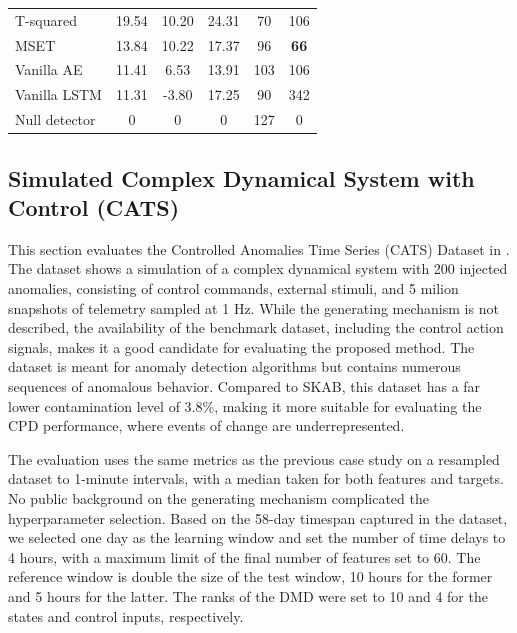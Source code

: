 \begin{table}[H]
\begin{tabular}{l *3{S[table-format=3.2]} *2{S[table-format=3.0]}}
        T-squared                    & 19.54          & 10.20          & 24.31          & 70          & 106         \\
        MSET                         & 13.84          & 10.22          & 17.37          & 96          & \textbf{66} \\
        Vanilla AE                   & 11.41          & 6.53           & 13.91          & 103         & 106         \\
        Vanilla LSTM                 & 11.31          & -3.80          & 17.25          & 90          & 342         \\
        \midrule
        Null detector                & 0              & 0              & 0              & 127         & 0           \\
        \bottomrule
    \end{tabular}
\end{table}


\subsection{Simulated Complex Dynamical System with Control (CATS)}
This section evaluates the Controlled Anomalies Time Series (CATS) Dataset in \citet{Schmidl2022}. The dataset shows a simulation of a complex dynamical system with 200 injected anomalies, consisting of control commands, external stimuli, and 5 milion snapshots of telemetry sampled at 1 Hz. While the generating mechanism is not described, the availability of the benchmark dataset, including the control action signals, makes it a good candidate for evaluating the proposed method. The dataset is meant for anomaly detection algorithms but contains numerous sequences of anomalous behavior. Compared to SKAB, this dataset has a far lower contamination level of 3.8\%, making it more suitable for evaluating the CPD performance, where events of change are underrepresented.

The evaluation uses the same metrics as the previous case study on a resampled dataset to 1-minute intervals, with a median taken for both features and targets. No public background on the generating mechanism complicated the hyperparameter selection. Based on the 58-day timespan captured in the dataset, we selected one day as the learning window and set the number of time delays to 4 hours, with a maximum limit of the final number of features set to 60. The reference window is double the size of the test window, 10 hours for the former and 5 hours for the latter. The ranks of the DMD were set to 10 and 4 for the states and control inputs, respectively.

